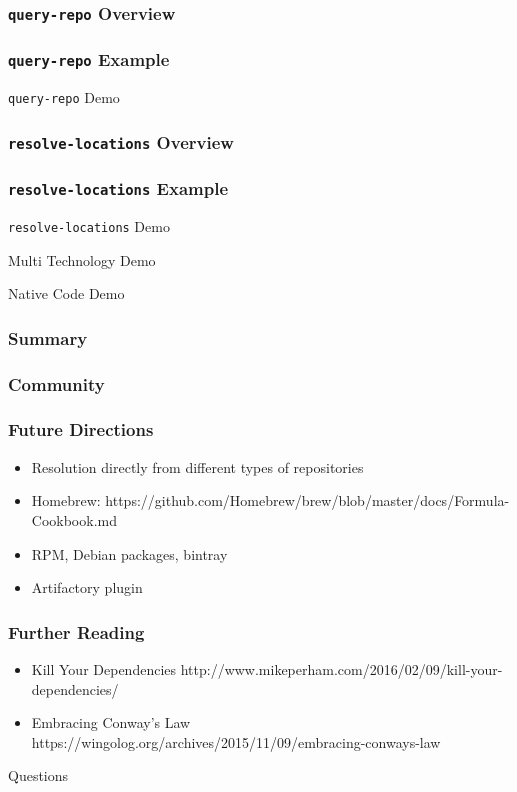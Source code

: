 \documentclass{beamer}
\begin{document}
\begin{frame}
  \frametitle{\texttt{query-repo} Overview}
\end{frame}
\begin{frame}
  \frametitle{\texttt{query-repo} Example}
\end{frame}
\begin{frame}
  \centerline{\color{blue}\Large \texttt{query-repo} Demo}
\end{frame}
\begin{frame}
  \frametitle{\texttt{resolve-locations} Overview}
\end{frame}
\begin{frame}
  \frametitle{\texttt{resolve-locations} Example}
\end{frame}
\begin{frame}
  \centerline{\color{blue}\Large \texttt{resolve-locations} Demo}
\end{frame}
\begin{frame}
  \centerline{\color{blue}\Large Multi Technology Demo}
\end{frame}
\begin{frame}
  \centerline{\color{blue}\Large Native Code Demo}
\end{frame}
\begin{frame}
  \frametitle{Summary}
\end{frame}
\begin{frame}
  \frametitle{Community}
\end{frame}
\begin{frame}
  \frametitle{Future Directions}
  \begin{itemize}
  \item Resolution directly from different types of repositories
  \item Homebrew: https://github.com/Homebrew/brew/blob/master/docs/Formula-Cookbook.md
  \item RPM, Debian packages, bintray
  \item Artifactory plugin
  \end{itemize}
\end{frame}
\begin{frame}
  \frametitle{Further Reading}
  \begin{itemize}
  \item Kill Your Dependencies http://www.mikeperham.com/2016/02/09/kill-your-dependencies/
  \item Embracing Conway's Law https://wingolog.org/archives/2015/11/09/embracing-conways-law
  \end{itemize}
\end{frame}
\begin{frame}
  \centerline{\color{blue}\Large Questions}
\end{frame}
\end{document}

